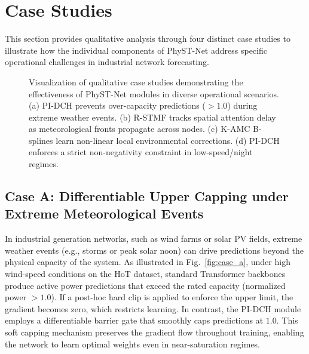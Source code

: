 \section{Case Studies}
\label{sec:case_studies}

This section provides qualitative analysis through four distinct case studies to illustrate how the individual components of PhyST-Net address specific operational challenges in industrial network forecasting.

\begin{figure}[!t]
\centering
{} \hfil
{} \hfil
{} \hfil
{}
\caption{Visualization of qualitative case studies demonstrating the effectiveness of PhyST-Net modules in diverse operational scenarios. (a) PI-DCH prevents over-capacity predictions ($>1.0$) during extreme weather events. (b) R-STMF tracks spatial attention delay as meteorological fronts propagate across nodes. (c) K-AMC B-splines learn non-linear local environmental corrections. (d) PI-DCH enforces a strict non-negativity constraint in low-speed/night regimes.}
\label{fig:case_studies_multi}
\end{figure}

\subsection{Case A: Differentiable Upper Capping under Extreme Meteorological Events}
In industrial generation networks, such as wind farms or solar PV fields, extreme weather events (e.g., storms or peak solar noon) can drive predictions beyond the physical capacity of the system.
As illustrated in Fig.~\ref{fig:case_a}, under high wind-speed conditions on the HoT dataset, standard Transformer backbones produce active power predictions that exceed the rated capacity (normalized power $>1.0$). If a post-hoc hard clip is applied to enforce the upper limit, the gradient becomes zero, which restricts learning. In contrast, the PI-DCH module employs a differentiable barrier gate that smoothly caps predictions at $1.0$. This soft capping mechanism preserves the gradient flow throughout training, enabling the network to learn optimal weights even in near-saturation regimes.

